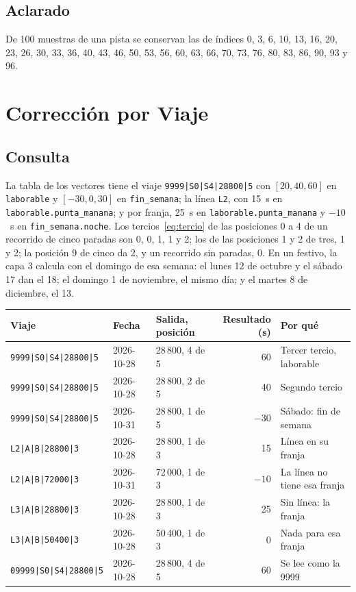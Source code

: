 \subsection{Aclarado} De 100 muestras de una pista se conservan las de índices 0, 3, 6, 10, 13, 16, 20, 23, 26, 30,
33, 36, 40, 43, 46, 50, 53, 56, 60, 63, 66, 70, 73, 76, 80, 83, 86, 90, 93 y 96.

\section{Corrección por Viaje}

\subsection{Consulta} La tabla de los vectores tiene el viaje \texttt{9999|S0|S4|28800|5} con $[20,40,60]$ en
\texttt{laborable} y $[-30,0,30]$ en \texttt{fin\_semana}; la línea \texttt{L2}, con 15~s en
\texttt{laborable.punta\_manana}; y por franja, 25~s en \texttt{laborable.punta\_manana} y $-10$~s en
\texttt{fin\_semana.noche}. Los tercios~\eqref{eq:tercio} de las posiciones 0 a 4 de un recorrido de cinco paradas son
0, 0, 1, 1 y 2; los de las posiciones 1 y 2 de tres, 1 y 2; la posición 9 de cinco da 2, y un recorrido sin paradas,
0. En un festivo, la capa 3 calcula con el domingo de esa semana: el lunes 12 de octubre y el sábado 17 dan el 18; el
domingo 1 de noviembre, el mismo día; y el martes 8 de diciembre, el 13.

\begin{center}
\small
\begin{tabular}{@{}lllrl@{}}
\toprule
Viaje & Fecha & Salida, posición & Resultado (s) & Por qué\\
\midrule
\texttt{9999|S0|S4|28800|5} & 2026-10-28 & 28\,800, 4 de 5 & 60 & Tercer tercio, laborable\\
\texttt{9999|S0|S4|28800|5} & 2026-10-28 & 28\,800, 2 de 5 & 40 & Segundo tercio\\
\texttt{9999|S0|S4|28800|5} & 2026-10-31 & 28\,800, 1 de 5 & $-30$ & Sábado: fin de semana\\
\texttt{L2|A|B|28800|3} & 2026-10-28 & 28\,800, 1 de 3 & 15 & Línea en su franja\\
\texttt{L2|A|B|72000|3} & 2026-10-31 & 72\,000, 1 de 3 & $-10$ & La línea no tiene esa franja\\
\texttt{L3|A|B|28800|3} & 2026-10-28 & 28\,800, 1 de 3 & 25 & Sin línea: la franja\\
\texttt{L3|A|B|50400|3} & 2026-10-28 & 50\,400, 1 de 3 & 0 & Nada para esa franja\\
\texttt{09999|S0|S4|28800|5} & 2026-10-28 & 28\,800, 4 de 5 & 60 & Se lee como la 9999\\
\bottomrule
\end{tabular}
\end{center}

